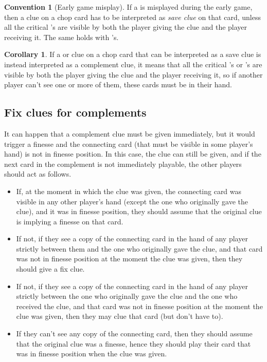 \documentclass[a4paper]{article}
\theoremstyle{plain}
\theoremstyle{definition}
\newtheorem{corollary}[theorem]{Corollary}
\newtheorem{convention}[theorem]{Convention}
\begin{document}
\begin{convention}[Early game misplay]
	If a  is misplayed during the early game, then a  clue on a chop card has to be interpreted as \emph{save clue} on that card, unless all the critical 's are visible by both the player giving the clue and the player receiving it. The same holds with 's.
\end{convention}

\begin{corollary}
	If a  or  clue on a chop card that can be interpreted as a save clue is instead interpreted as a complement clue, it means that all the critical 's or 's are visible by both the player giving the clue and the player receiving it, so if another player can't see one or more of them, these cards must be in their hand.
\end{corollary}

\subsection{Fix clues for complements}

It can happen that a complement clue must be given immediately, but it would trigger a finesse and the connecting card (that must be visible in some player's hand) is not in finesse position. In this case, the clue can still be given, and if the next card in the complement is not immediately playable, the other players should act as follows.

\begin{itemize}
	\item If, at the moment in which the clue was given, the connecting card was visible in any other player's hand (except the one who originally gave the clue), and it was in finesse position, they should assume that the original clue is implying a finesse on that card.
	\item If not, if they see a copy of the connecting card in the hand of any player strictly between them and the one who originally gave the clue, and that card was not in finesse position at the moment the clue was given, then they should give a fix clue.
	\item If not, if they see a copy of the connecting card in the hand of any player strictly between the one who originally gave the clue and the one who received the clue, and that card was not in finesse position at the moment the clue was given, then they may clue that card (but don't have to).
	\item If they can't see any copy of the connecting card, then they should assume that the original clue was a finesse, hence they should play their card that was in finesse position when the clue was given.
\end{itemize}
\end{document}
